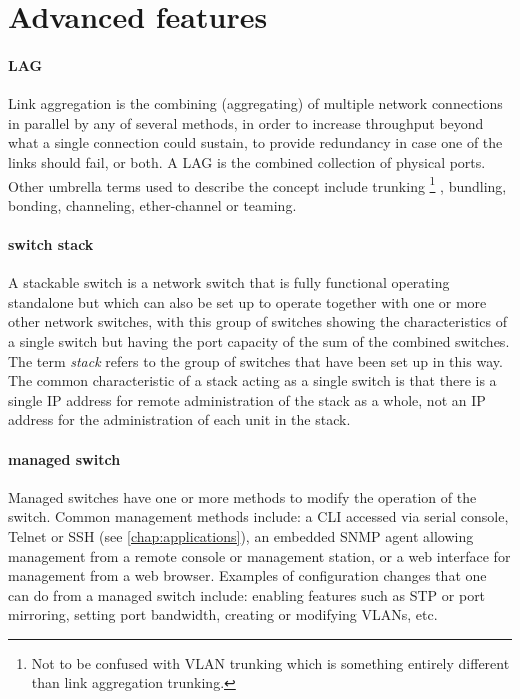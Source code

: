 \section{Advanced features}
\label{sec:ethernet-advanced-features}

\paragraph{\acf{LAG}}
Link aggregation is the combining (aggregating) of multiple network connections in parallel by any of several methods, in order to increase throughput beyond what a single connection could sustain, to provide redundancy in case one of the links should fail, or both.
A \ac{LAG} is the combined collection of physical ports.
Other umbrella terms used to describe the concept include trunking%
   \footnote{Not to be confused with \acs{VLAN} trunking which is something entirely different than link aggregation trunking.}%
, bundling, bonding, channeling, ether-channel or teaming.


\paragraph{switch stack}
A stackable switch is a network switch that is fully functional operating standalone but which can also be set up to operate together with one or more other network switches, with this group of switches showing the characteristics of a single switch but having the port capacity of the sum of the combined switches.
The term \emph{stack} refers to the group of switches that have been set up in this way.
The common characteristic of a stack acting as a single switch is that there is a single \acs{IP} address for remote administration of the stack as a whole, not an \acs{IP} address for the administration of each unit in the stack.

\paragraph{managed switch}
\label{par:ethernet-switch-managed}
Managed switches have one or more methods to modify the operation of the switch.
Common management methods include: a \ac{CLI} accessed via serial console, Telnet or \ac{SSH} (see \vref{chap:applications}), an embedded \ac{SNMP} agent allowing management from a remote console or management station, or a web interface for management from a web browser.
Examples of configuration changes that one can do from a managed switch include: enabling features such as \ac{STP} or port mirroring, setting port bandwidth, creating or modifying \acp{VLAN}, etc.

